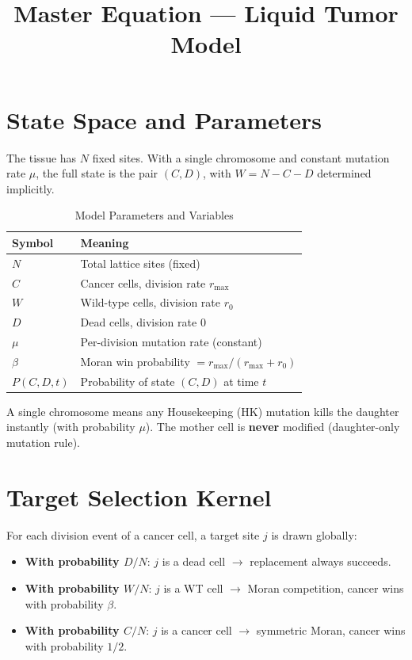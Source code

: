 \documentclass[11pt,a4paper]{article}
\title{\textbf{Master Equation — Liquid Tumor Model}}
\author{}
\date{}
\begin{document}
\maketitle

\section{State Space and Parameters}

The tissue has $N$ fixed sites. With a single chromosome and constant mutation rate $\mu$, the full state is the pair $(C, D)$, with $W = N - C - D$ determined implicitly.

\begin{table}[h!]
\centering
\caption{Model Parameters and Variables}
\begin{tabular}{ll}
\toprule
\textbf{Symbol} & \textbf{Meaning} \\
\midrule
$N$ & Total lattice sites (fixed) \\
$C$ & Cancer cells, division rate $r_{\max}$ \\
$W$ & Wild-type cells, division rate $r_0$ \\
$D$ & Dead cells, division rate $0$ \\
$\mu$ & Per-division mutation rate (constant) \\
$\beta$ & Moran win probability $= r_{\max} / (r_{\max} + r_0)$ \\
$P(C,D,t)$ & Probability of state $(C,D)$ at time $t$ \\
\bottomrule
\end{tabular}
\end{table}

A single chromosome means any Housekeeping (HK) mutation kills the daughter instantly (with probability $\mu$). The mother cell is \textbf{never} modified (daughter-only mutation rule).

\section{Target Selection Kernel}

For each division event of a cancer cell, a target site $j$ is drawn globally:
\begin{itemize}
    \item \textbf{With probability $D/N$}: $j$ is a dead cell $\rightarrow$ replacement always succeeds.
    \item \textbf{With probability $W/N$}: $j$ is a WT cell $\rightarrow$ Moran competition, cancer wins with probability $\beta$.
    \item \textbf{With probability $C/N$}: $j$ is a cancer cell $\rightarrow$ symmetric Moran, cancer wins with probability $1/2$.
\end{itemize}
\end{document}
